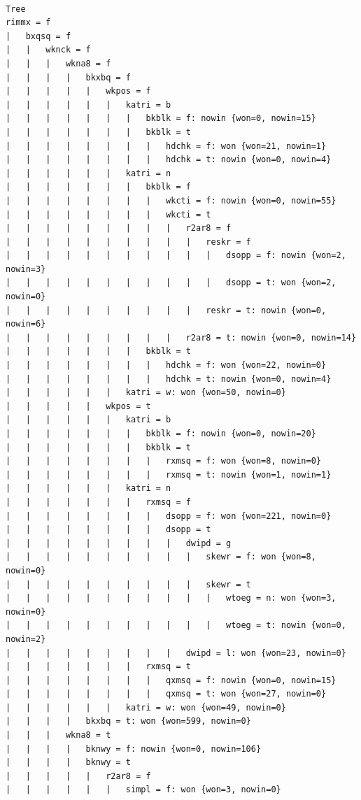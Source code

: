 \documentclass[11pt]{article}
\begin{document}
\mbox{} \\[1cm]
\small\begin{verbatim}
Tree
rimmx = f
|   bxqsq = f
|   |   wknck = f
|   |   |   wkna8 = f
|   |   |   |   bkxbq = f
|   |   |   |   |   wkpos = f
|   |   |   |   |   |   katri = b
|   |   |   |   |   |   |   bkblk = f: nowin {won=0, nowin=15}
|   |   |   |   |   |   |   bkblk = t
|   |   |   |   |   |   |   |   hdchk = f: won {won=21, nowin=1}
|   |   |   |   |   |   |   |   hdchk = t: nowin {won=0, nowin=4}
|   |   |   |   |   |   katri = n
|   |   |   |   |   |   |   bkblk = f
|   |   |   |   |   |   |   |   wkcti = f: nowin {won=0, nowin=55}
|   |   |   |   |   |   |   |   wkcti = t
|   |   |   |   |   |   |   |   |   r2ar8 = f
|   |   |   |   |   |   |   |   |   |   reskr = f
|   |   |   |   |   |   |   |   |   |   |   dsopp = f: nowin {won=2, nowin=3}
|   |   |   |   |   |   |   |   |   |   |   dsopp = t: won {won=2, nowin=0}
|   |   |   |   |   |   |   |   |   |   reskr = t: nowin {won=0, nowin=6}
|   |   |   |   |   |   |   |   |   r2ar8 = t: nowin {won=0, nowin=14}
|   |   |   |   |   |   |   bkblk = t
|   |   |   |   |   |   |   |   hdchk = f: won {won=22, nowin=0}
|   |   |   |   |   |   |   |   hdchk = t: nowin {won=0, nowin=4}
|   |   |   |   |   |   katri = w: won {won=50, nowin=0}
|   |   |   |   |   wkpos = t
|   |   |   |   |   |   katri = b
|   |   |   |   |   |   |   bkblk = f: nowin {won=0, nowin=20}
|   |   |   |   |   |   |   bkblk = t
|   |   |   |   |   |   |   |   rxmsq = f: won {won=8, nowin=0}
|   |   |   |   |   |   |   |   rxmsq = t: nowin {won=1, nowin=1}
|   |   |   |   |   |   katri = n
|   |   |   |   |   |   |   rxmsq = f
|   |   |   |   |   |   |   |   dsopp = f: won {won=221, nowin=0}
|   |   |   |   |   |   |   |   dsopp = t
|   |   |   |   |   |   |   |   |   dwipd = g
|   |   |   |   |   |   |   |   |   |   skewr = f: won {won=8, nowin=0}
|   |   |   |   |   |   |   |   |   |   skewr = t
|   |   |   |   |   |   |   |   |   |   |   wtoeg = n: won {won=3, nowin=0}
|   |   |   |   |   |   |   |   |   |   |   wtoeg = t: nowin {won=0, nowin=2}
|   |   |   |   |   |   |   |   |   dwipd = l: won {won=23, nowin=0}
|   |   |   |   |   |   |   rxmsq = t
|   |   |   |   |   |   |   |   qxmsq = f: nowin {won=0, nowin=15}
|   |   |   |   |   |   |   |   qxmsq = t: won {won=27, nowin=0}
|   |   |   |   |   |   katri = w: won {won=49, nowin=0}
|   |   |   |   bkxbq = t: won {won=599, nowin=0}
|   |   |   wkna8 = t
|   |   |   |   bknwy = f: nowin {won=0, nowin=106}
|   |   |   |   bknwy = t
|   |   |   |   |   r2ar8 = f
|   |   |   |   |   |   simpl = f: won {won=3, nowin=0}

\end{verbatim}
\end{document}

